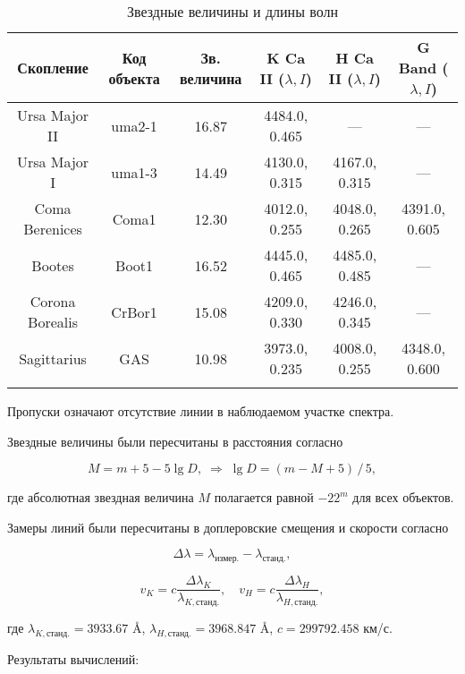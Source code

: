 \begin{table}[h]
  \centering
  \caption{Звездные величины и длины волн}
  \begin{tabular}{cccccc}
    \toprule
    Скопление &
    Код объекта &
    Зв. величина &
    K Ca II ($ \lambda, I $) &
    H Ca II ($ \lambda, I $) &
    G Band ($ \lambda, I $) \\
    \midrule
    Ursa Major II & uma2-1 & 16.87 & 4484.0, 0.465 & --- & --- \\
    \arrayrulecolor{black!40}
    \midrule
    Ursa Major I & uma1-3 & 14.49 & 4130.0, 0.315 & 4167.0, 0.315 & --- \\
    \midrule
    Coma Berenices & Coma1 & 12.30 & 4012.0, 0.255 & 4048.0, 0.265 & 4391.0, 0.605 \\
    \midrule
    Bootes & Boot1 & 16.52 & 4445.0, 0.465 & 4485.0, 0.485 & --- \\
    \midrule
    Corona Borealis & CrBor1 & 15.08 & 4209.0, 0.330 & 4246.0, 0.345 & --- \\
    \midrule
    Sagittarius & GAS & 10.98 & 3973.0, 0.235 & 4008.0, 0.255 & 4348.0, 0.600 \\
    \arrayrulecolor{black}
    \bottomrule
  \end{tabular}
\end{table}

Пропуски означают отсутствие линии в наблюдаемом участке спектра. \npar

Звездные величины были пересчитаны в расстояния согласно

$$
M = m + 5 - 5 \lg{D}, \; \Longrightarrow \; \lg{D} = (m - M + 5) \, / \, 5,
$$
\su

где абсолютная звездная величина $M$ полагается равной $-22^m$ для всех объектов. \npar

Замеры линий были пересчитаны в доплеровские смещения и скорости согласно

$$
\Delta \lambda = \lambda_{\text{измер.}} - \lambda_{\text{станд.}},
$$
\su

\su\su
$$
v_K = c \frac{\Delta \lambda_K}{\lambda_{K, \text{станд.}}}, \quad
v_H = c \frac{\Delta \lambda_H}{\lambda_{H, \text{станд.}}},
$$
\sd

где $ \lambda_{K, \text{станд.}} = 3933.67 $ \AA, $ \lambda_{H, \text{станд.}} = 3968.847 $ \AA, $ c = 299792.458 $ км/с. \npar

\newpage

Результаты вычислений:

